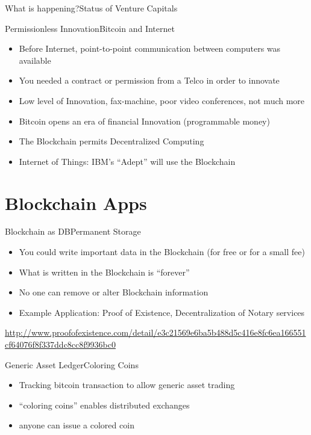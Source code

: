 \documentclass[english,compress]{beamer}
\begin{document}
\begin{frame}{What is happening?}{Status of Venture Capitals}
\end{frame}

\begin{frame}{Permissionless Innovation}{Bitcoin and Internet}
\begin{itemize}
 \item Before Internet, point-to-point communication between computers was available
 \item You needed a contract or permission from a Telco in order to innovate
 \item Low level of Innovation, fax-machine, poor video conferences, not much more
 \item Bitcoin opens an era of financial Innovation (programmable money)
 \item The Blockchain permits Decentralized Computing
 \item Internet of Things: IBM's ``Adept'' will use the Blockchain 
\end{itemize}
\end{frame}

\section{Blockchain Apps}

\begin{frame}{Blockchain as DB}{Permanent Storage}
\begin{itemize}
 \item You could write important data in the Blockchain (for free or for a small fee)
 \item What is written in the Blockchain is ``forever''
 \item No one can remove or alter Blockchain information
 \item Example Application: Proof of Existence, Decentralization of Notary services 
\end{itemize}
 
\begin{tiny}
 \url{http://www.proofofexistence.com/detail/e3c21569e6ba5b488d5c416e8fc6ea166551cf64076f8f337ddc8cc8f9936bc0}
\end{tiny}
\end{frame}

\begin{frame}{Generic Asset Ledger}{Coloring Coins}
\begin{itemize}
\item Tracking bitcoin transaction to allow generic asset trading
\item ``coloring coins'' enables distributed exchanges
\item anyone can issue a colored coin
\end{itemize}
\vfill
{}
\end{frame}
\end{document}
